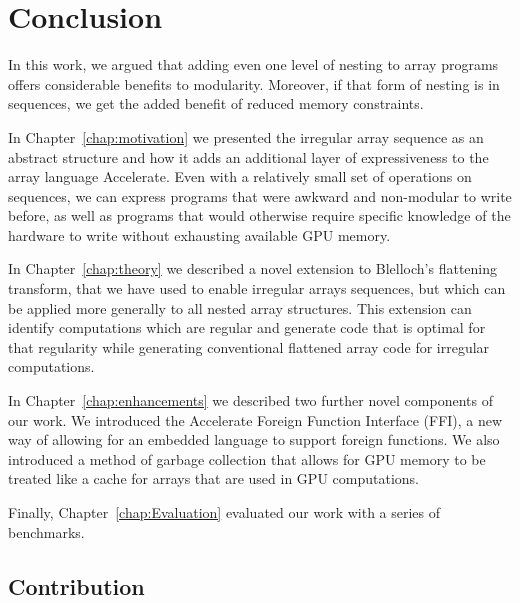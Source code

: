 \chapter{Conclusion}


In this work, we argued that adding even one level of nesting to array programs offers considerable benefits to modularity. Moreover, if that form of nesting is in sequences, we get the added benefit of reduced memory constraints.

In Chapter~\ref{chap:motivation} we presented the irregular array sequence as an abstract structure and how it adds an additional layer of expressiveness to the array language Accelerate. Even with a relatively small set of operations on sequences, we can express programs that were awkward and non-modular to write before, as well as programs that would otherwise require specific knowledge of the hardware to write without exhausting available GPU memory.

In Chapter~\ref{chap:theory} we described a novel extension to Blelloch's flattening transform, that we have used to enable irregular arrays sequences, but which can be applied more generally to all nested array structures. This extension can identify computations which are regular and generate code that is optimal for that regularity while generating conventional flattened array code for irregular computations.

In Chapter~\ref{chap:enhancements} we described two further novel components of our work. We introduced the Accelerate Foreign Function Interface (FFI), a new way of allowing for an embedded language to support foreign functions. We also introduced a method of garbage collection that allows for GPU memory to be treated like a cache for arrays that are used in GPU computations.

Finally, Chapter~\ref{chap:Evaluation} evaluated our work with a series of benchmarks.

\section{Contribution}

